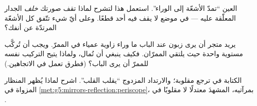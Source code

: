 \begin{exercise}[$\star\star$]\label{exo:g5:mirrors-reflection:9}
العين ``تمدّ الأشعّة إلى الوراء''. استعمل هذا لتشرح لماذا تقف
صورتك \emph{خلف} الجدار المعلّقة عليه  --- في موضع لا يقف
فيه أحد قطعًا. وعلى أيّ شيء تتّفق كل الأشعّة المرتدّة عن أنفك؟
\end{exercise}

\begin{exercise}[$\star\star$]\label{exo:g5:mirrors-reflection:10}
يريد متجر أن يرى زبون عند الباب ما وراء زاوية عمياء في الممرّ.
ويجب أن تُركَّب  مستوية واحدة حيث يلتقي الممرّان. فكيف
ينبغي أن تُمال، ولماذا يتيح التركيب نفسه للممرّ أن يرى الباب؟
(فطرق  تعمل في الاتجاهين.)
\end{exercise}

\begin{exercise}[$\star\star$]\label{exo:g5:mirrors-reflection:11}
الكتابة في  ترجع مقلوبة؛ والارتداد المزدوج ``يقلب
القلب''. اشرح لماذا يُظهر المنظار المزواة في
\cref{met:g5:mirrors-reflection:periscope}، بمرآتيه، المشهدَ
معتدلًا لا مقلوبًا في .
\end{exercise}
